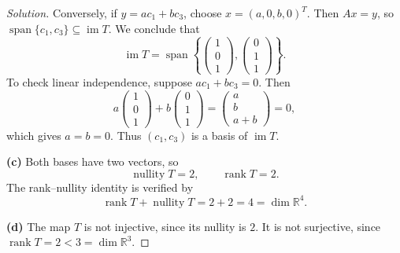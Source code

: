 \begin{proof}[Solution]
    Conversely, if \(y=ac_1+bc_3\), choose
    \(x=(a,0,b,0)^T\). Then \(Ax=y\), so
    \(\operatorname{span}\{c_1,c_3\}\subseteq\operatorname{im}T\).
    We conclude that
    \[
      \operatorname{im}T=
      \operatorname{span}\left\{
        \begin{pmatrix}1\\0\\1\end{pmatrix},
        \begin{pmatrix}0\\1\\1\end{pmatrix}
      \right\}.
    \]
    To check linear independence, suppose \(ac_1+bc_3=0\). Then
    \[
      a\begin{pmatrix}1\\0\\1\end{pmatrix}
      +b\begin{pmatrix}0\\1\\1\end{pmatrix}
      =\begin{pmatrix}a\\b\\a+b\end{pmatrix}=0,
    \]
    which gives \(a=b=0\). Thus \((c_1,c_3)\) is a basis of
    \(\operatorname{im}T\).

  \textbf{(c)} Both bases have two vectors, so
    \[
      \operatorname{nullity}T=2,
      \qquad
      \operatorname{rank}T=2.
    \]
    The rank--nullity identity is verified by
    \[
      \operatorname{rank}T+\operatorname{nullity}T
        =2+2=4=\dim\mathbb{R}^4.
    \]

  \textbf{(d)} The map \(T\) is not injective, since its nullity is \(2\).
    It is not surjective, since
    \(\operatorname{rank}T=2<3=\dim\mathbb{R}^3\).
\end{proof}

